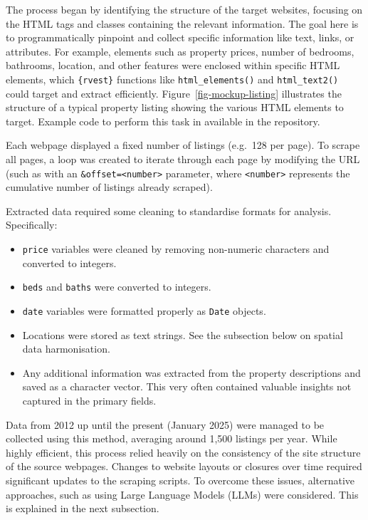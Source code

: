 \documentclass[
  number]{elsarticle}
\providecommand{\tightlist}{%
  \setlength{\itemsep}{0pt}\setlength{\parskip}{0pt}}\usepackage{longtable,booktabs,array}
\begin{document}
The process began by identifying the structure of the target websites,
focusing on the HTML tags and classes containing the relevant
information. The goal here is to programmatically pinpoint and collect
specific information like text, links, or attributes. For example,
elements such as property prices, number of bedrooms, bathrooms,
location, and other features were enclosed within specific HTML
elements, which \texttt{\{rvest\}} functions like
\texttt{html\_elements()} and \texttt{html\_text2()} could target and
extract efficiently. Figure~\ref{fig-mockup-listing} illustrates the
structure of a typical property listing showing the various HTML
elements to target. Example code to perform this task in available in
the repository.

Each webpage displayed a fixed number of listings (e.g.~128 per page).
To scrape all pages, a loop was created to iterate through each page by
modifying the URL (such as with an
\texttt{\&offset=\textless{}number\textgreater{}} parameter, where
\texttt{\textless{}number\textgreater{}} represents the cumulative
number of listings already scraped).

Extracted data required some cleaning to standardise formats for
analysis. Specifically:

\begin{itemize}
\tightlist
\item
  \texttt{price} variables were cleaned by removing non-numeric
  characters and converted to integers.
\item
  \texttt{beds} and \texttt{baths} were converted to integers.
\item
  \texttt{date} variables were formatted properly as \texttt{Date}
  objects.
\item
  Locations were stored as text strings. See the subsection below on
  spatial data harmonisation.
\item
  Any additional information was extracted from the property
  descriptions and saved as a character vector. This very often
  contained valuable insights not captured in the primary fields.
\end{itemize}

Data from 2012 up until the present (January 2025) were managed to be
collected using this method, averaging around 1,500 listings per year.
While highly efficient, this process relied heavily on the consistency
of the site structure of the source webpages. Changes to website layouts
or closures over time required significant updates to the scraping
scripts. To overcome these issues, alternative approaches, such as using
Large Language Models (LLMs) were considered. This is explained in the
next subsection.
\end{document}
